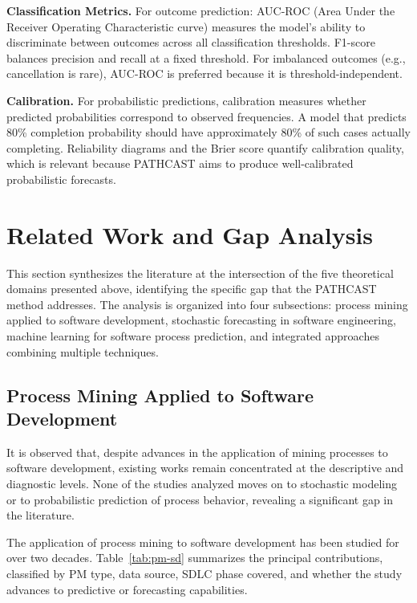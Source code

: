 \textbf{Classification Metrics.} For outcome prediction: AUC-ROC
(Area Under the Receiver Operating Characteristic curve) measures the
model's ability to discriminate between outcomes across all
classification thresholds. F1-score balances precision and recall at a
fixed threshold. For imbalanced outcomes (e.g., cancellation is rare),
AUC-ROC is preferred because it is threshold-independent.

\textbf{Calibration.} For probabilistic predictions, calibration measures
whether predicted probabilities correspond to observed frequencies. A
model that predicts 80\% completion probability should have approximately
80\% of such cases actually completing. Reliability diagrams and the
Brier score quantify calibration quality, which is relevant because
PATHCAST aims to produce well-calibrated probabilistic forecasts.


\section{Related Work and Gap Analysis}
\label{sec:related-work}

This section synthesizes the literature at the intersection of the five
theoretical domains presented above, identifying the specific gap that
the PATHCAST method addresses. The analysis is organized into four
subsections: process mining applied to software development, stochastic
forecasting in software engineering, machine learning for software process
prediction, and integrated approaches combining multiple techniques.


\subsection{Process Mining Applied to Software Development}
\label{sec:rw-pm-sd}
It is observed that, despite advances in the application of mining processes to software development, existing works remain concentrated at the descriptive and diagnostic levels. None of the studies analyzed moves on to stochastic modeling or to probabilistic prediction of process behavior, revealing a significant gap in the literature.

The application of process mining to software development has been
studied for over two decades. Table~\ref{tab:pm-sd} summarizes the
principal contributions, classified by PM type, data source, SDLC
phase covered, and whether the study advances to predictive or
forecasting capabilities.

